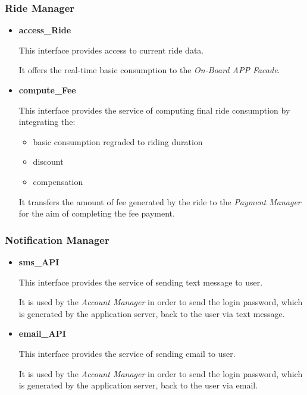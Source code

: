 \documentclass[a4paper,11pt]{article}
\begin{document}
		\subsubsection{Ride Manager}
			\begin{itemize}
				\item \textbf{access\_Ride}

This interface provides access to current ride data.

It offers the real-time basic consumption to the \textsl{On-Board APP Facade}.
				
				\item \textbf{compute\_Fee}

This interface provides the service of computing final ride consumption by integrating the:
					\begin{itemize}
						\item basic consumption regraded to riding duration
						\item discount 
						\item compensation 
					\end{itemize}					 

It transfers the amount of fee generated by the ride to the \textsl{Payment Manager} for the aim of completing the fee payment.
				
			\end{itemize}
			
		\subsubsection{Notification Manager}
			\begin{itemize}
				\item \textbf{sms\_API}

This interface provides the service of sending text message to user.

It is used by the \textsl{Account Manager} in order to send the login password, which is generated by the application server, back to the user via text message.

				\item \textbf{email\_API}

This interface provides the service of sending email to user.

It is used by the \textsl{Account Manager} in order to send the login password, which is generated by the application server, back to the user via email.

			\end{itemize}
			
\end{document}
